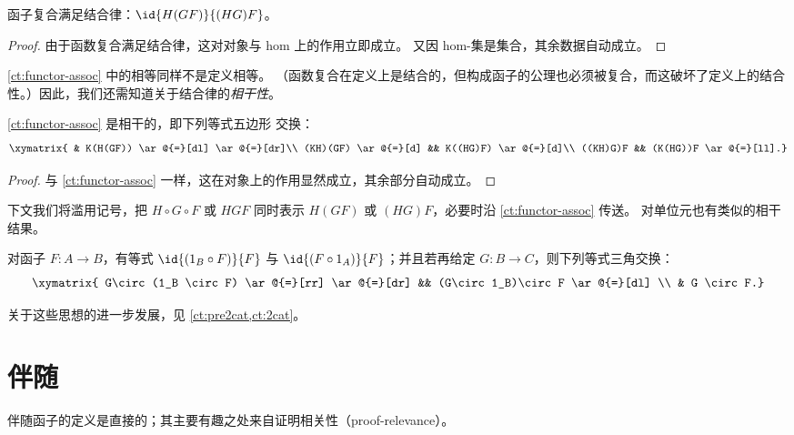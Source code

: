 \begin{lem}\label{ct:functor-assoc}
  函子复合满足结合律：$\id{H(GF)}{(HG)F}$。
\end{lem}
\begin{proof}
  由于函数复合满足结合律，这对对象与 hom 上的作用立即成立。
  又因 hom-集是集合，其余数据自动成立。
\end{proof}

\cref{ct:functor-assoc} 中的相等同样不是定义相等。
（函数复合在定义上是结合的，但构成函子的公理也必须被复合，而这破坏了定义上的结合性。）因此，我们还需知道关于结合律的\emph{相干性}。

\begin{lem}\label{ct:pentagon}
  \cref{ct:functor-assoc} 是相干的，即下列等式五边形 交换：
  \[ \xymatrix{ & K(H(GF)) \ar@{=}[dl] \ar@{=}[dr]\\
    (KH)(GF) \ar@{=}[d] && K((HG)F) \ar@{=}[d]\\
    ((KH)G)F && (K(HG))F \ar@{=}[ll].}
  \]
\end{lem}
\begin{proof}
  与 \cref{ct:functor-assoc} 一样，这在对象上的作用显然成立，其余部分自动成立。
\end{proof}

下文我们将滥用记号，把 $H\circ G\circ F$ 或 $HGF$ 同时表示 $H(GF)$ 或 $(HG)F$，必要时沿 \cref{ct:functor-assoc} 传送。
对单位元也有类似的相干结果。

\begin{lem}\label{ct:units}
  对函子 $F:A\to B$，有等式 $\id{(1_B\circ F)}{F}$ 与 $\id{(F\circ 1_A)}{F}$；并且若再给定 $G:B\to C$，则下列等式三角交换：
  \[ \xymatrix{
    G\circ (1_B \circ F) \ar@{=}[rr] \ar@{=}[dr] &&
    (G\circ 1_B)\circ F \ar@{=}[dl] \\
    & G \circ F.}
  \]
\end{lem}

关于这些思想的进一步发展，见 \cref{ct:pre2cat,ct:2cat}。

\section{伴随}
\label{sec:adjunctions}

伴随函子的定义是直接的；其主要有趣之处来自证明相关性（proof-relevance）。

